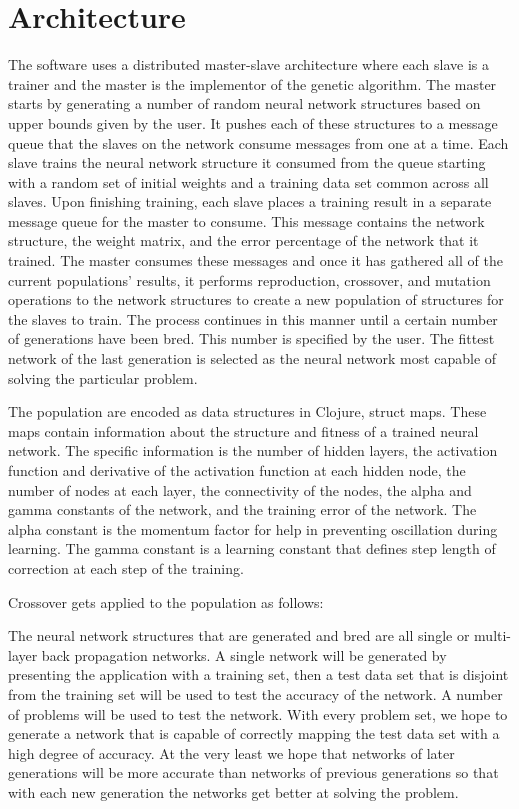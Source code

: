 \section{Architecture}
The software uses a distributed master-slave architecture where each slave is a trainer and the master is the implementor of the genetic algorithm. The master starts by generating a number of random neural network structures based on upper bounds given by the user. It pushes each of these structures to a message queue that the slaves on the network consume messages from one at a time. Each slave trains the neural network structure it consumed from the queue starting with a random set of initial weights and a training data set common across all slaves. Upon finishing training, each slave places a training result in a separate message queue for the master to consume. This message contains the network structure, the weight matrix, and the error percentage of the network that it trained. The master consumes these messages and once it has gathered all of the current populations' results, it performs reproduction, crossover, and mutation operations to the network structures to create a new population of structures for the slaves to train. The process continues in this manner until a certain number of generations have been bred. This number is specified by the user. The fittest network of the last generation is selected as the neural network most capable of solving the particular problem.  

The population are encoded as data structures in Clojure, struct maps. These maps contain information about the structure and fitness of a trained neural network. The specific information is the number of hidden layers, the activation function and derivative of the activation function at each hidden node, the number of nodes at each layer, the connectivity of the nodes, the alpha and gamma constants of the network, and the training error of the network. The alpha constant is the momentum factor for help in preventing oscillation during learning. The gamma constant is a learning constant that defines step length of correction at each step of the training.

Crossover gets applied to the population as follows:

The neural network structures that are generated and bred are all single or multi-layer back propagation networks.  A single network will be generated by presenting the application with a training set, then a test data set that is disjoint from the training set will be used to test the accuracy of the network.  A number of problems will be used to test the network.  With every problem set, we hope to generate a network that is capable of correctly mapping the test data set with a high degree of accuracy.  At the very least we hope that networks of later generations will be more accurate than networks of previous generations so that with each new generation the networks get better at solving the problem.